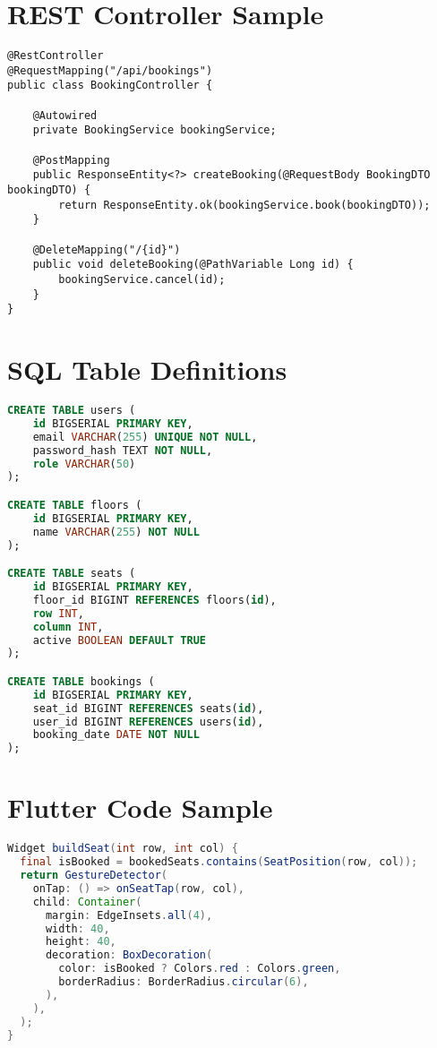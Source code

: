 \documentclass[12pt,a4paper]{report}
\begin{document}
\chapter{REST Controller Sample}
\label{appendix:controller}

\begin{lstlisting}[caption=Booking Controller (Java), label=lst:booking-controller]
@RestController
@RequestMapping("/api/bookings")
public class BookingController {

    @Autowired
    private BookingService bookingService;

    @PostMapping
    public ResponseEntity<?> createBooking(@RequestBody BookingDTO bookingDTO) {
        return ResponseEntity.ok(bookingService.book(bookingDTO));
    }

    @DeleteMapping("/{id}")
    public void deleteBooking(@PathVariable Long id) {
        bookingService.cancel(id);
    }
}
\end{lstlisting}

\chapter{SQL Table Definitions}
\label{appendix:sql}

\begin{lstlisting}[language=SQL,caption=Table Definitions,label=lst:sql-schema]
CREATE TABLE users (
    id BIGSERIAL PRIMARY KEY,
    email VARCHAR(255) UNIQUE NOT NULL,
    password_hash TEXT NOT NULL,
    role VARCHAR(50)
);

CREATE TABLE floors (
    id BIGSERIAL PRIMARY KEY,
    name VARCHAR(255) NOT NULL
);

CREATE TABLE seats (
    id BIGSERIAL PRIMARY KEY,
    floor_id BIGINT REFERENCES floors(id),
    row INT,
    column INT,
    active BOOLEAN DEFAULT TRUE
);

CREATE TABLE bookings (
    id BIGSERIAL PRIMARY KEY,
    seat_id BIGINT REFERENCES seats(id),
    user_id BIGINT REFERENCES users(id),
    booking_date DATE NOT NULL
);
\end{lstlisting}

\chapter{Flutter Code Sample}
\label{appendix:flutter}

\begin{lstlisting}[language=Java,caption=Seat Booking Widget (Flutter),label=lst:flutter-ui]
Widget buildSeat(int row, int col) {
  final isBooked = bookedSeats.contains(SeatPosition(row, col));
  return GestureDetector(
    onTap: () => onSeatTap(row, col),
    child: Container(
      margin: EdgeInsets.all(4),
      width: 40,
      height: 40,
      decoration: BoxDecoration(
        color: isBooked ? Colors.red : Colors.green,
        borderRadius: BorderRadius.circular(6),
      ),
    ),
  );
}
\end{lstlisting}
\end{document}
